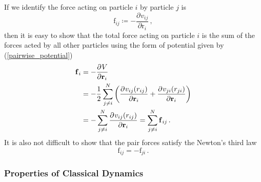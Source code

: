 \documentclass{article}
\theoremstyle{plain}\theoremheaderfont{\normalfont\itshape}\theorembodyfont{\rmfamily}\theoremseparator{.}\newtheorem*{rem}{Remark}\newtheorem*{ex}{Example}\newtheorem*{proof}{Proof}\newtheorem*{altp}{Alternative proof}
\theoremstyle{plain}\theoremheaderfont{\normalfont\bfseries}\theorembodyfont{\rmfamily}\theoremseparator{.}\newtheorem{thm}{Theorem}[section]\newtheorem{lem}[thm]{Lemma}\newtheorem{prop}[thm]{Proposition}\newtheorem*{cor}{Corollary}\newtheorem{defn}[thm]{Definition}\newtheorem{clm}[thm]{Claim}\newtheorem{clminproof}{Claim}\newtheorem{alg}[thm]{Algorithm}\newtheorem{hyp}[thm]{Hypothesis}\newtheorem{law}[thm]{Law}
\theoremstyle{break}\theoremheaderfont{\normalfont\itshape}\theorembodyfont{\rmfamily}\theoremseparator{.\medskip}\newtheorem*{proofskip}{Proof}\newtheorem*{exs}{Examples}\newtheorem*{rems}{Remarks}
\theoremstyle{break}\theoremheaderfont{\normalfont\bfseries}\theorembodyfont{\rmfamily}\theoremseparator{.\medskip}\newtheorem{lemskip}[thm]{Lemma}\newtheorem{defnskip}[thm]{Definition}\newtheorem{propskip}[thm]{Proposition}\newtheorem{thmskip}[thm]{Theorem}
\numberwithin{equation}{section}
\newcommand{\pdv}[3][]{\frac{\partial^{#1} #2}{{\partial #3}^{#1}}}
\newcommand{\vb}[1]{\bm{\mathrm{#1}}}
\begin{document}
    If we identify the force acting on particle \(i\) by particle \(j\) is
    \begin{equation}
        \vb{f}_{ij}\coloneqq-\pdv{v_{ij}}{\vb{r}_i}\,,
    \end{equation}
    then it is easy to show that the total force acting on particle \(i\) is the sum of the forces acted by all other particles using the form of potential given by (\ref{pairwise_potential})
    \begin{align}
        \vb{f}_i&=-\pdv{V}{\vb{r}_i}\notag\\
        &=-\frac{1}{2}\sum_{j\ne i}^{N}\left(\pdv{v_{ij}(r_{ij})}{\vb{r}_i}+\pdv{v_{ji}(r_{ji})}{\vb{r}_i}\right)\notag\\
        &=-\sum_{j\ne i}^{N}\pdv{v_{ij}(r_{ij})}{\vb{r}_i}=\sum_{j\ne i}^{N}\vb{f}_{ij}\,.
    \end{align}
    It is also not difficult to show that the pair forces satisfy the Newton's third law
    \begin{equation}
        \vb{f}_{ij}=-\vb{f}_{ji}\,.
    \end{equation}

    \subsubsection{Properties of Classical Dynamics}
\end{document}
